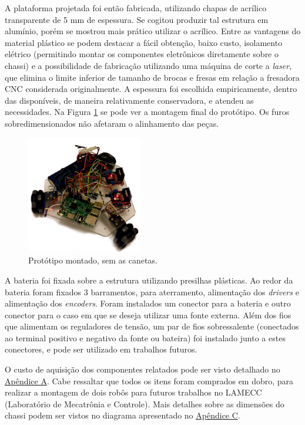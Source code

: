 A plataforma projetada foi então fabricada, utilizando chapas de acrílico transparente de 5 mm de espessura. Se cogitou produzir tal estrutura em alumínio, porém se mostrou mais prático utilizar o acrílico. Entre as vantagens do material plástico se podem destacar a fácil obtenção, baixo custo, isolamento elétrico (permitindo montar os componentes eletrônicos diretamente sobre o chassi) e a possibilidade de fabricação utilizando uma máquina de corte a \textit{laser}, que elimina o limite inferior de tamanho de brocas e fresas em relação a fresadora CNC considerada originalmente. A espessura foi escolhida empiricamente, dentro das disponíveis, de maneira relativamente conservadora, e atendeu as necessidades. Na Figura \ref{fig:montagem} se pode ver a montagem final do protótipo. Os furos sobredimensionados não afetaram o alinhamento das peças.

\begin{figure}[h]
  \centering
  \includegraphics[width = 0.45\textwidth]{imagens/roboto}
  \caption{Protótipo montado, sem as canetas.}
  \label{fig:montagem}
\end{figure}

A bateria foi fixada sobre a estrutura utilizando presilhas plásticas. Ao redor da bateria foram fixados 3 barramentos, para aterramento, alimentação dos \textit{drivers} e alimentação dos \textit{encoders}. Foram instalados um conector para a bateria e outro conector para o caso em que se deseja utilizar uma fonte externa.  Além dos fios que alimentam os reguladores de tensão, um par de fios sobressalente (conectados ao terminal positivo e negativo da fonte ou bateira) foi instalado junto a estes conectores, e pode ser utilizado em trabalhos futuros.

O custo de aquisição dos componentes relatados pode ser visto detalhado no \hyperref[sec:custo]{Apêndice A}. Cabe ressaltar que todos os itens foram comprados em dobro, para realizar a montagem de dois robôs para futuros trabalhos no LAMECC (Laboratório de Mecatrônia e Controle). Mais detalhes sobre as dimensões do chassi podem ser vistos no diagrama apresentado no \hyperref[sec:draw]{Apêndice C}.

